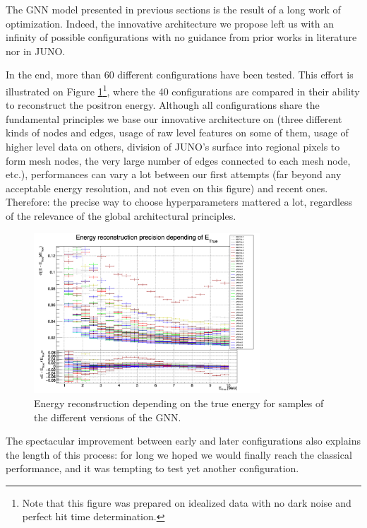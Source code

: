 \documentclass[../main.tex]{subfiles}
\begin{document}
The GNN model presented in previous sections is the result of a long work of optimization. Indeed, the innovative architecture we propose left us with an infinity of possible configurations with no guidance from prior works in literature nor in JUNO.

In the end, more than 60 different configurations have been tested. This effort is illustrated on Figure \ref{fig:jgnn:histor}\footnote{Note that this figure was prepared on idealized data with no dark noise and perfect hit time determination.},
where the 40 configurations are compared in their ability to reconstruct the positron energy. Although all configurations share the fundamental principles we base our innovative architecture on (three different kinds of nodes and edges, usage of raw level features on some of them, usage of higher level data on others, division of JUNO's surface into regional pixels to form mesh nodes, the very large number of edges connected to each mesh node, etc.), performances can vary a lot between our first attempts (far beyond any acceptable energy resolution, and not even on this figure) and recent ones. Therefore: the precise way to choose hyperparameters mattered a lot, regardless of the relevance of the global architectural principles.

\begin{figure}
  \centering
  \includegraphics[height=6cm]{images/jgnn/GNN_Optimization_hist.png}
  \caption{Energy reconstruction depending on the true energy for samples of the different versions of the GNN.}
  \label{fig:jgnn:histor}
\end{figure}

The spectacular improvement between early and later configurations also explains the length of this process: for long we hoped we would finally reach the classical performance, and it was tempting to test yet another configuration.

\end{document}
